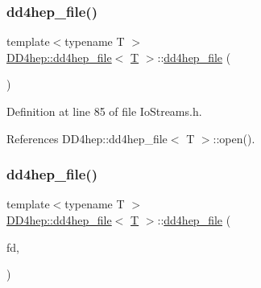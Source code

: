 \subsubsection{\texorpdfstring{dd4hep\+\_\+file()}{dd4hep\_file()}\hspace{0.1cm}{\footnotesize\ttfamily [1/7]}}
{\footnotesize\ttfamily template$<$typename T $>$ \\
\hyperlink{class_d_d4hep_1_1dd4hep__file}{D\+D4hep\+::dd4hep\+\_\+file}$<$ \hyperlink{class_t}{T} $>$\+::\hyperlink{class_d_d4hep_1_1dd4hep__file}{dd4hep\+\_\+file} (\begin{DoxyParamCaption}{ }\end{DoxyParamCaption})\hspace{0.3cm}{\ttfamily [inline]}}



Definition at line 85 of file Io\+Streams.\+h.



References D\+D4hep\+::dd4hep\+\_\+file$<$ T $>$\+::open().

\hypertarget{class_d_d4hep_1_1dd4hep__file_a171ba6ea4aa627da95bfd8bb7d8aa7a2}{}\label{class_d_d4hep_1_1dd4hep__file_a171ba6ea4aa627da95bfd8bb7d8aa7a2} 
\subsubsection{\texorpdfstring{dd4hep\+\_\+file()}{dd4hep\_file()}\hspace{0.1cm}{\footnotesize\ttfamily [2/7]}}
{\footnotesize\ttfamily template$<$typename T $>$ \\
\hyperlink{class_d_d4hep_1_1dd4hep__file}{D\+D4hep\+::dd4hep\+\_\+file}$<$ \hyperlink{class_t}{T} $>$\+::\hyperlink{class_d_d4hep_1_1dd4hep__file}{dd4hep\+\_\+file} (\begin{DoxyParamCaption}\item[{\hyperlink{class_d_d4hep_1_1dd4hep__file_a4d79f8d433cd7831ff818691424cd6fc}{handle\+\_\+type}}]{fd,  }\item[{\hyperlink{namespace_d_d4hep_a31d19f9b0ce567067d2897fbda1761e5}{dd4hep\+\_\+file\+\_\+flags}}]{ }\end{DoxyParamCaption})}

\hypertarget{class_d_d4hep_1_1dd4hep__file_a7d25851ca4633fca12a3d23ec2eb4fe1}{}\label{class_d_d4hep_1_1dd4hep__file_a7d25851ca4633fca12a3d23ec2eb4fe1} 
